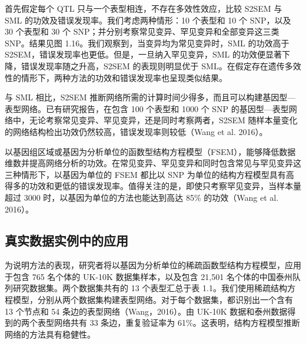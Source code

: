 首先假定每个 QTL 只与一个表型相连，不存在多效性效应，比较 S2SEM 与 SML 的功效及错误发现率。我们考虑两种情形：10 个表型和 10 个 SNP，以及 30 个表型和 30 个 SNP；并分别考察常见变异、罕见变异和全部变异这三类 SNP。结果见图 1.16。我们观察到，当变异均为常见变异时，SML 的功效高于 S2SEM，错误发现率也更低。但是，一旦纳入罕见变异，SML 的功效便显著下降，错误发现率随之升高，S2SEM 的表现则明显优于 SML。在假定存在遗传多效性的情形下，两种方法的功效和错误发现率也呈现类似结果。



与 SML 相比，S2SEM 推断网络所需的计算时间少得多，而且可以构建基因型—表型网络。已有研究报告，在包含 100 个表型和 1000 个 SNP 的基因型—表型网络中，无论考察常见变异、罕见变异，还是同时考察两者，S2SEM 随样本量变化的网络结构检出功效仍然较高，错误发现率则较低（Wang et al. 2016）。

以基因组区域或基因为分析单位的函数型结构方程模型（FSEM），能够降低数据维数并提高网络分析的功效。在常见变异、罕见变异和同时包含常见与罕见变异这三种情形下，以基因为单位的 FSEM 都比以 SNP 为单位的结构方程模型具有高得多的功效和更低的错误发现率。值得关注的是，即使只考察罕见变异，当样本量超过 3000 时，以基因为单位的方法也能达到高达 85\% 的功效（Wang et al. 2016）。

\FloatBarrier
\subsection{真实数据实例中的应用}

为说明方法的表现，研究者将以基因为分析单位的稀疏函数型结构方程模型，应用于包含 765 名个体的 UK-10K 数据集样本，以及包含 21,501 名个体的中国泰州队列研究数据集。两个数据集共有的 13 个表型汇总于表 1.1。我们使用稀疏结构方程模型，分别从两个数据集构建表型网络。对于每个数据集，都识别出一个含有 13 个节点和 54 条边的表型网络（Wang，2016）。由 UK-10K 数据和泰州数据得到的两个表型网络共有 33 条边，重复验证率为 61\%。这表明，结构方程模型推断网络的方法具有稳健性。

